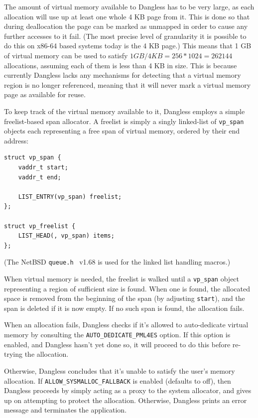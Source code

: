 The amount of virtual memory available to Dangless has to be very large, as each allocation will use up at least one whole 4 KB page from it. This is done so that during deallocation the page can be marked as unmapped in order to cause any further accesses to it fail. (The most precise level of granularity it is possible to do this on x86-64 based systems today is the 4 KB page.) This means that 1 GB of virtual memory can be used to satisfy $1 GB / 4 KB = 256 * 1024 = 262 144$ allocations, assuming each of them is less than 4 KB in size. This is because currently Dangless lacks any mechanisms for detecting that a virtual memory region is no longer referenced, meaning that it will never mark a virtual memory page as available for reuse.

To keep track of the virtual memory available to it, Dangless employs a simple freelist-based span allocator. A freelist is simply a singly linked-list of \lstinline!vp_span! objects each representing a free span of virtual memory, ordered by their end address:

\begin{lstlisting}
struct vp_span {
	vaddr_t start;
	vaddr_t end;
	
	LIST_ENTRY(vp_span) freelist;
};

struct vp_freelist {
	LIST_HEAD(, vp_span) items;
};
\end{lstlisting}

(The NetBSD \texttt{queue.h}~\cite{netbsd-queue-ref} v1.68 is used for the linked list handling macros.)

When virtual memory is needed, the freelist is walked until a \lstinline!vp_span! object representing a region of sufficient size is found. When one is found, the allocated space is removed from the beginning of the span (by adjusting \lstinline!start!), and the span is deleted if it is now empty. If no such span is found, the allocation fails.

When an allocation fails, Dangless checks if it's allowed to auto-dedicate virtual memory by consulting the \lstinline!AUTO_DEDICATE_PML4ES! option. If this option is enabled, and Dangless hasn't yet done so, it will proceed to do this before re-trying the allocation.

Otherwise, Dangless concludes that it's unable to satisfy the user's memory allocation. If \lstinline!ALLOW_SYSMALLOC_FALLBACK! is enabled (defaults to off), then Dangless proceeds by simply acting as a proxy to the system allocator, and gives up on attempting to protect the allocation. Otherwise, Dangless prints an error message and terminates the application.

